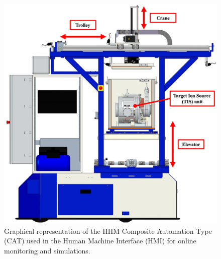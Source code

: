 \documentclass{ieeeojies}
\begin{document}
\begin{figure}[h!]
    \centering
    \includegraphics[width=\columnwidth]{pictures/lilli08.eps}
    \caption{Graphical representation of the HHM Composite Automation Type (CAT) used in the Human Machine Interface (HMI) for online monitoring and simulations.} 
    \label{fig:hmi}
\end{figure}
\end{document}
